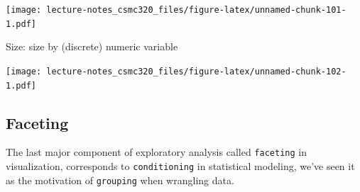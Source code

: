 \documentclass[12pt,]{book}
\newenvironment{Shaded}{\begin{snugshade}}{\end{snugshade}}
\newcommand{\KeywordTok}[1]{\textcolor[rgb]{0.13,0.29,0.53}{\textbf{#1}}}
\newcommand{\DataTypeTok}[1]{\textcolor[rgb]{0.13,0.29,0.53}{#1}}
\newcommand{\StringTok}[1]{\textcolor[rgb]{0.31,0.60,0.02}{#1}}
\newcommand{\OperatorTok}[1]{\textcolor[rgb]{0.81,0.36,0.00}{\textbf{#1}}}
\newcommand{\NormalTok}[1]{#1}
\theoremstyle{definition}
\theoremstyle{definition}
\theoremstyle{definition}
\theoremstyle{remark}
\begin{document}
\begin{Shaded}
\end{Shaded}

\texttt{[image: lecture-notes\_csmc320\_files/figure-latex/unnamed-chunk-101-1.pdf]}

Size: size by (discrete) numeric variable

\begin{Shaded}
\end{Shaded}

\texttt{[image: lecture-notes\_csmc320\_files/figure-latex/unnamed-chunk-102-1.pdf]}

\subsection{Faceting}\label{faceting}

The last major component of exploratory analysis called
\texttt{faceting} in visualization, corresponds to \texttt{conditioning}
in statistical modeling, we've seen it as the motivation of
\texttt{grouping} when wrangling data.
\end{document}
